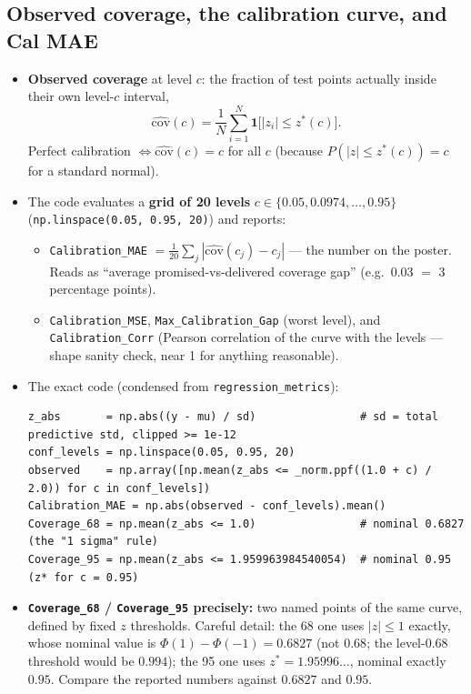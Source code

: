 \documentclass[10pt,a4paper]{article}
\newcommand{\code}[1]{\texttt{#1}}
\begin{document}
\subsection{Observed coverage, the calibration curve, and Cal MAE}
\begin{itemize}
\item \textbf{Observed coverage} at level $c$: the fraction of test points actually inside their
  own level-$c$ interval,
  \[
  \widehat{\mathrm{cov}}(c)=\frac1N\sum_{i=1}^{N}\mathbf{1}\bigl[|z_i|\le z^*(c)\bigr].
  \]
  Perfect calibration $\iff \widehat{\mathrm{cov}}(c)=c$ for all $c$ (because
  $P(|z|\le z^*(c))=c$ for a standard normal).
\item The code evaluates a \textbf{grid of 20 levels} $c\in\{0.05,0.0974,\dots,0.95\}$
  (\code{np.linspace(0.05, 0.95, 20)}) and reports:
  \begin{itemize}
  \item \code{Calibration\_MAE} $=\frac{1}{20}\sum_j|\widehat{\mathrm{cov}}(c_j)-c_j|$ --- the
    number on the poster. Reads as ``average promised-vs-delivered coverage gap'' (e.g.\ 0.03 $=$
    3 percentage points).
  \item \code{Calibration\_MSE}, \code{Max\_Calibration\_Gap} (worst level), and
    \code{Calibration\_Corr} (Pearson correlation of the curve with the levels --- shape sanity
    check, near 1 for anything reasonable).
  \end{itemize}
\item The exact code (condensed from \code{regression\_metrics}):
\begin{lstlisting}
z_abs       = np.abs((y - mu) / sd)                # sd = total predictive std, clipped >= 1e-12
conf_levels = np.linspace(0.05, 0.95, 20)
observed    = np.array([np.mean(z_abs <= _norm.ppf((1.0 + c) / 2.0)) for c in conf_levels])
Calibration_MAE = np.abs(observed - conf_levels).mean()
Coverage_68 = np.mean(z_abs <= 1.0)                # nominal 0.6827  (the "1 sigma" rule)
Coverage_95 = np.mean(z_abs <= 1.959963984540054)  # nominal 0.95    (z* for c = 0.95)
\end{lstlisting}
\item \textbf{\code{Coverage\_68} / \code{Coverage\_95} precisely:} two named points of the same
  curve, defined by fixed $z$ thresholds. Careful detail: the 68 one uses $|z|\le1$ exactly, whose
  nominal value is $\Phi(1)-\Phi(-1)=0.6827$ (not $0.68$; the level-$0.68$ threshold would be
  $0.994$); the 95 one uses $z^*=1.95996\ldots$, nominal exactly $0.95$. Compare the reported
  numbers against $0.6827$ and $0.95$.

\end{itemize}
\end{document}
